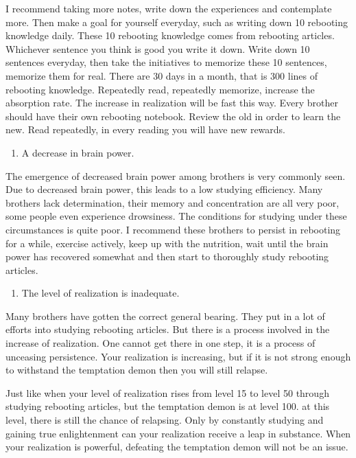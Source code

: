 \documentclass[
]{book}
\providecommand{\tightlist}{%
  \setlength{\itemsep}{0pt}\setlength{\parskip}{0pt}}
\begin{document}
I recommend taking more notes, write down the experiences and contemplate more. Then make a goal for yourself everyday, such as writing down 10 rebooting knowledge daily. These 10 rebooting knowledge comes from rebooting articles. Whichever sentence you think is good you write it down. Write down 10 sentences everyday, then take the initiatives to memorize these 10 sentences, memorize them for real. There are 30 days in a month, that is 300 lines of rebooting knowledge. Repeatedly read, repeatedly memorize, increase the absorption rate. The increase in realization will be fast this way. Every brother should have their own rebooting notebook. Review the old in order to learn the new. Read repeatedly, in every reading you will have new rewards.

\begin{enumerate}
\def\labelenumi{(\arabic{enumi})}
\setcounter{enumi}{1}
\tightlist
\item
  A decrease in brain power.
\end{enumerate}

The emergence of decreased brain power among brothers is very commonly seen. Due to decreased brain power, this leads to a low studying efficiency. Many brothers lack determination, their memory and concentration are all very poor, some people even experience drowsiness. The conditions for studying under these circumstances is quite poor. I recommend these brothers to persist in rebooting for a while, exercise actively, keep up with the nutrition, wait until the brain power has recovered somewhat and then start to thoroughly study rebooting articles.

\begin{enumerate}
\def\labelenumi{(\arabic{enumi})}
\setcounter{enumi}{2}
\tightlist
\item
  The level of realization is inadequate.
\end{enumerate}

Many brothers have gotten the correct general bearing. They put in a lot of efforts into studying rebooting articles. But there is a process involved in the increase of realization. One cannot get there in one step, it is a process of unceasing persistence. Your realization is increasing, but if it is not strong enough to withstand the temptation demon then you will still relapse.

Just like when your level of realization rises from level 15 to level 50 through studying rebooting articles, but the temptation demon is at level 100. at this level, there is still the chance of relapsing. Only by constantly studying and gaining true enlightenment can your realization receive a leap in substance. When your realization is powerful, defeating the temptation demon will not be an issue.
\end{document}
